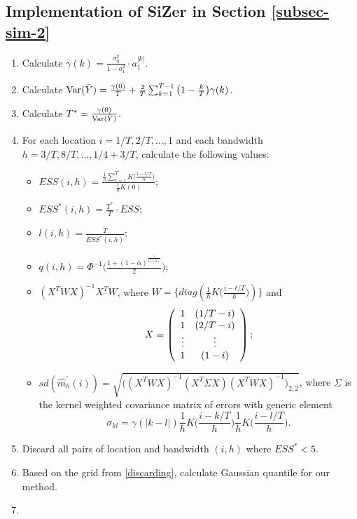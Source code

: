 \subsection*{Implementation of SiZer in Section \ref{subsec-sim-2}}


\begin{enumerate}[label=Step \arabic*:, leftmargin=1.5cm]
\item Calculate $\gamma(k) = \frac{\sigma_\eta^2 }{1 - a_1^2}\cdot a_1^{|k|}$.
\item Calculate $\textnormal{Var}(\bar{Y}) = \frac{\gamma(0)}{T} + \frac{2}{T} \sum_{k = 1}^{T-1} \big(1 - \frac{k}{T}\big)\gamma(k)$.
\item Calculate $T^* = \frac{\gamma(0)}{\textnormal{Var}(\bar{Y})}$.
\item For each location $i = 1/T, 2/T, \ldots, 1$ and each bandwidth $h = 3/T, 8/T,\ldots, 1/4 + 3/T$, calculate the following values:
\begin{itemize}[leftmargin=0.5cm]
	\item $ESS(i, h) = \frac{\frac{1}{h}\sum_{t =1}^T K\big(\frac{i - t/T}{h}\big)}{\frac{1}{h}K(0)}$;
	\item $ESS^*(i, h) =\frac{T^*}{T} \cdot ESS$;
	\item $l(i, h) = \frac{T}{ESS^*(i, h)}$;
	\item $q(i, h) = \Phi^{-1} \Big(\frac{1 + (1 - \alpha)^{\frac{1}{l(i, h)}}}{2}\Big)$;
	\item $(X^T W X)^{-1} X^T W$, where $W = \{diag(\frac{1}{h} K\big(\frac{i - t/T}{h}\big))\}$ and 
	\begin{equation}
	X =  \left( \begin{array}{c c}
	                1 & (1/T - i) \\
			1 & (2/T - i)  \\
			\vdots & \vdots \\
			1 & (1 - i)  \\
		   \end{array} \right); \nonumber
	\end{equation}
	\item $sd(\widehat{m}^\prime_h(i)) = \sqrt{\big((X^T W X)^{-1} (X^T \Sigma X) (X^T W X)^{-1}\big)_{2, 2}}$, where $\Sigma$ is the kernel weighted covariance matrix of errors with generic element $$\sigma_{kl} = \gamma(|k - l|) \frac{1}{h} K\Big(\frac{i - k/T}{h}\Big) \frac{1}{h}  K\Big(\frac{i - l/T}{h}\Big).$$
	\end{itemize}
\item\label{discarding} Discard all pairs of location and bandwidth $(i, h)$ where $ESS^* < 5$.
\item Based on the grid from \ref{discarding}, calculate Gaussian quantile for our method.
\item 
\end{enumerate}
